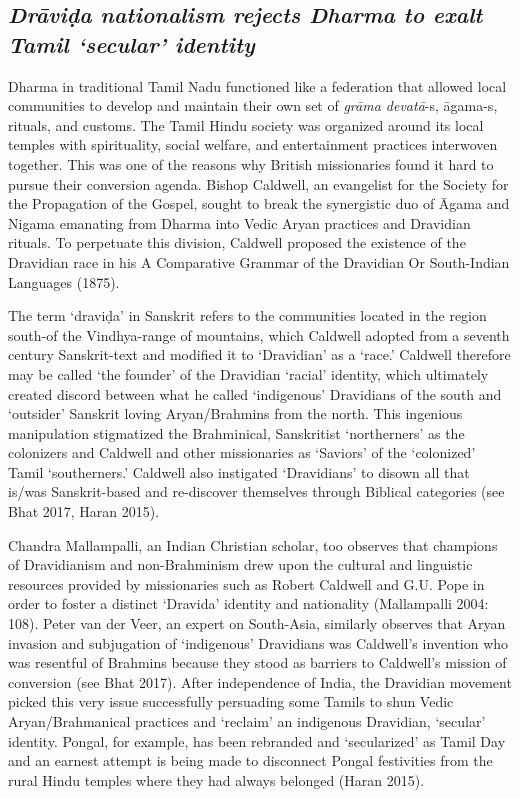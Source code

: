 \subsection*{\textit{Drāviḍa nationalism rejects Dharma to exalt Tamil ‘secular’ identity }}

\vskip -10pt

Dharma in traditional Tamil Nadu functioned like a federation that allowed local communities to develop and maintain their own set of \textit{grāma devatā}-s, āgama-s, rituals, and customs. The Tamil Hindu society was organized around its local temples with spirituality, social welfare, and entertainment practices interwoven together. This was one of the reasons why British missionaries found it hard to pursue their conversion agenda. Bishop Caldwell, an evangelist for the Society for the Propagation of the Gospel, sought to break the synergistic duo of Āgama and Nigama emanating from Dharma into Vedic Aryan practices and Dravidian rituals. To perpetuate this division, Caldwell proposed the existence of the Dravidian race in his A Comparative Grammar of the Dravidian Or South-Indian Languages (1875).

The term ‘draviḍa’ in Sanskrit refers to the communities located in the region south-of the Vindhya-range of mountains, which Caldwell adopted from a seventh century Sanskrit-text and modified it to ‘Dravidian’ as a ‘race.’ Caldwell therefore may be called ‘the founder’ of the Dravidian ‘racial’ identity, which ultimately created discord between what he called ‘indigenous’ Dravidians of the south and ‘outsider’ Sanskrit loving Aryan/Brahmins from the north. This ingenious manipulation stigmatized the Brahminical, Sanskritist ‘northerners’ as the colonizers and Caldwell and other missionaries as ‘Saviors’ of the ‘colonized’ Tamil ‘southerners.’ Caldwell also instigated ‘Dravidians’ to disown all that is/was Sanskrit-based and re-discover themselves through Biblical categories (see Bhat 2017, Haran 2015).

Chandra Mallampalli, an Indian Christian scholar, too observes that champions of Dravidianism and non-Brahminism drew upon the cultural and linguistic resources provided by missionaries such as Robert Caldwell and G.U. Pope in order to foster a distinct ‘Dravida’ identity and nationality (Mallampalli 2004: 108). Peter van der Veer, an expert on South-Asia, similarly observes that Aryan invasion and subjugation of ‘indigenous’ Dravidians was Caldwell’s invention who was resentful of Brahmins because they stood as barriers to Caldwell’s mission of conversion (see Bhat 2017). After independence of India, the Dravidian movement picked this very issue successfully persuading some Tamils to shun Vedic Aryan/Brahmanical practices and ‘reclaim’ an indigenous Dravidian, ‘secular’ identity. Pongal, for example, has been rebranded and ‘secularized’ as Tamil Day and an earnest attempt is being made to disconnect Pongal festivities from the rural Hindu temples where they had always belonged (Haran 2015).


